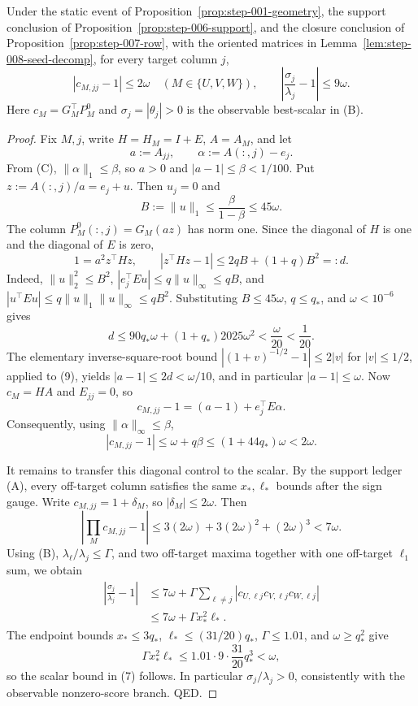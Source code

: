 \begin{lemma}\label{lem:step-008-best-scalar}
Under the static event of Proposition~\ref{prop:step-001-geometry}, the
support conclusion of Proposition~\ref{prop:step-006-support}, and the
closure conclusion of Proposition~\ref{prop:step-007-row}, with the oriented matrices in
Lemma~\ref{lem:step-008-seed-decomp}, for every target column $j$,
\[
 |c_{M,jj}-1|\le2\omega\quad(M\in\{U,V,W\}),\qquad
 \left|\frac{\sigma_j}{\lambda_j}-1\right|\le9\omega. \tag{7}
\]
Here $c_M=G_M^\top P_M^0$ and $\sigma_j=|\theta_j|>0$ is the observable
best-scalar in (B).

\begin{proof}

Fix $M,j$, write $H=H_M=I+E$, $A=A_M$, and let
\[
 a:=A_{jj},\qquad \alpha:=A(:,j)-e_j.
\]
From (C), $\|\alpha\|_1\le\beta$, so $a>0$ and
$|a-1|\le\beta<1/100$. Put $z:=A(:,j)/a=e_j+u$. Then $u_j=0$ and
\[
 B:=\|u\|_1\le\frac{\beta}{1-\beta}\le45\omega. \tag{8}
\]
The column $P_M^0(:,j)=G_M(az)$ has norm one. Since the diagonal of $H$
is one and the diagonal of $E$ is zero,
\[
 1=a^2 z^\top H z,\qquad
 |z^\top H z-1|\le2qB+(1+q)B^2=:d. \tag{9}
\]
Indeed, $\|u\|_2^2\le B^2$, $|e_j^\top Eu|\le q\|u\|_\infty\le qB$,
and $|u^\top Eu|\le q\|u\|_1\|u\|_\infty\le qB^2$. Substituting
$B\le45\omega$, $q\le q_*$, and $\omega<10^{-6}$ gives
\[
 d\le90q_*\omega+(1+q_*)2025\omega^2<\frac{\omega}{20}<\frac1{20}. \tag{10}
\]
The elementary inverse-square-root bound
$|(1+v)^{-1/2}-1|\le2|v|$ for $|v|\le1/2$, applied to (9), yields
$|a-1|\le2d<\omega/10$, and in particular $|a-1|\le\omega$. Now
$c_M=HA$ and $E_{jj}=0$, so
\[
 c_{M,jj}-1=(a-1)+e_j^\top E\alpha.
\]
Consequently, using $\|\alpha\|_\infty\le\beta$,
\[
 |c_{M,jj}-1|\le\omega+q\beta
 \le(1+44q_*)\omega<2\omega. \tag{11}
\]

It remains to transfer this diagonal control to the scalar. By the support ledger (A), every off-target column satisfies the same $x_*,\ell_*$
bounds after the sign gauge. Write $c_{M,jj}=1+\delta_M$, so
$|\delta_M|\le2\omega$. Then
\[
 \left|\prod_M c_{M,jj}-1\right|
 \le3(2\omega)+3(2\omega)^2+(2\omega)^3
 <7\omega. \tag{12}
\]
Using (B), $\lambda_\ell/\lambda_j\le\Gamma$, and two off-target maxima
together with one off-target $\ell_1$ sum, we obtain
\[
\begin{aligned}
 \left|\frac{\sigma_j}{\lambda_j}-1\right|
 &\le 7\omega+
 \Gamma\sum_{\ell\ne j}
 |c_{U,\ell j}c_{V,\ell j}c_{W,\ell j}|\\
 &\le 7\omega+\Gamma x_*^2\ell_*.
\end{aligned} \tag{13}
\]
The endpoint bounds $x_*\le3q_*$, $\ell_*\le(31/20)q_*$,
$\Gamma\le1.01$, and $\omega\ge q_*^2$ give
\[
 \Gamma x_*^2\ell_*
 \le1.01\cdot9\cdot\frac{31}{20}q_*^3
 <\omega, \tag{14}
\]
so the scalar bound in (7) follows. In particular
$\sigma_j/\lambda_j>0$, consistently with the observable nonzero-score
branch. QED.


\end{proof}
\end{lemma}
